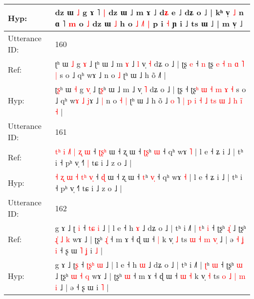 \documentclass[10pt]{article}
\DeclareRobustCommand{\hl}[1]{{\textcolor{red}{#1}}}
\begin{document}
\begin{longtable}{ll}
 \\
Hyp: & dz ɯ \hl{˩} g ɤ ˥\hl{ }\hl{|} dz ɯ ˩ m ɤ ˩ d\hl{ʑ} e ˩ dʑ o ˩ | kʰ v̩ \hl{˩} n ɑ ˥\hl{}\hl{} \hl{m} o \hl{˩} dz ɯ \hl{˩} h o\hl{ }\hl{˩}\hl{ }\hl{˩}\hl{˥} \hl{|} p i \hl{˧} ɲ i ˩ ts ɯ ˩ | m v̩ ˩
 \\
\midrule
Utterance ID: & 160 \\
Ref: & ʈ\hl{}ʰ ɯ \hl{˩} g \hl{}\hl{ɤ} ˩ ʈ\hl{}ʰ ɯ ˩ m\hl{ }\hl{ɤ} ˩\hl{ }\hl{l} v̩ \hl{˧} dʑ o ˩ | ʈʂ\hl{ }\hl{e} ˧\hl{ }\hl{n} ʈʂ\hl{ }\hl{e} \hl{˧} \hl{n} \hl{ɑ} \hl{˥} \hl{|} s o ˩ qʰ w\hl{}\hl{}\hl{}\hl{}\hl{}ɤ ˩\hl{}\hl{} n o\hl{}\hl{} \hl{˩} ʈʰ ɯ ˩ h õ ˩\hl{}\hl{}\hl{}˥\hl{}\hl{}\hl{}\hl{}\hl{}\hl{}\hl{}\hl{}\hl{}\hl{}\hl{}\hl{}\hl{}\hl{}\hl{}\hl{}\hl{}\hl{}\hl{}\hl{}\hl{}\hl{}\hl{}\hl{} |
 \\
Hyp: & ʈ\hl{ʂ}ʰ ɯ \hl{˧} g \hl{v}\hl{̩} ˩ ʈ\hl{ʂ}ʰ ɯ ˩ m\hl{}\hl{} ˩\hl{}\hl{} v̩ \hl{˥} dʑ o ˩ | ʈʂ\hl{}\hl{} ˧\hl{}\hl{} ʈʂ\hl{}\hl{ʰ} \hl{ɯ} \hl{˧} \hl{m} \hl{ɤ} \hl{˧} s o ˩ qʰ w\hl{ɤ}\hl{ }\hl{˩}\hl{ }\hl{j}ɤ ˩\hl{ }\hl{|} n o\hl{ }\hl{˧} \hl{|} ʈʰ ɯ ˩ h õ ˩\hl{ }\hl{o}\hl{ }˥\hl{ }\hl{|}\hl{ }\hl{p}\hl{ }\hl{i}\hl{ }\hl{˧}\hl{ }\hl{˩}\hl{ }\hl{t}\hl{s}\hl{ }\hl{ɯ}\hl{ }\hl{˩}\hl{ }\hl{h}\hl{ }\hl{i}\hl{̃}\hl{ }\hl{˧} |
 \\
\midrule
Utterance ID: & 161 \\
Ref: & \hl{t}\hl{ʰ} \hl{i} \hl{˩}\hl{˥} \hl{|} \hl{}\hl{ʐ} \hl{}\hl{ɯ} ˧ \hl{ʈ}\hl{ʂ}\hl{ʰ} ɯ ˧ ʐ ɯ ˧ \hl{ʈ}\hl{ʂ}ʰ \hl{}\hl{ɯ} ˧ qʰ wɤ \hl{˥} | l e ˧ ʑ i ˩ | tʰ i ˧ pʰ v̩ ˧˥\hl{ }\hl{|} tɕ i ˩ z o ˩ |
 \\
Hyp: & \hl{}\hl{˧} \hl{ʐ} \hl{}\hl{ɯ} \hl{˧} \hl{t}\hl{ʰ} \hl{v}\hl{̩} ˧ \hl{}\hl{}\hl{ɖ} ɯ ˧ ʐ ɯ ˧ \hl{}\hl{t}ʰ \hl{v}\hl{̩} ˧ qʰ wɤ \hl{˧} | l e ˧ ʑ i ˩ | tʰ i ˧ pʰ v̩ ˧˥\hl{}\hl{} tɕ i ˩ z o ˩ |
 \\
\midrule
Utterance ID: & 162 \\
Ref: & g ɤ ˩ ʈ\hl{ }\hl{i} ˧ \hl{}\hl{t}\hl{ɕ} \hl{i} ˩ | l e ˧ h \hl{ɤ} ˩ dʑ o ˩ | tʰ i ˩˥ | \hl{t}ʰ \hl{i} ˧ ʈʂʰ \hl{ɻ}\hl{̍} ˩ ʈʂʰ \hl{ɻ}\hl{̍} \hl{˩} \hl{k} wɤ ˩ | ʈʂʰ \hl{ɻ}\hl{̍} ˧ m ɤ ˧ ɖ ɯ ˧\hl{}\hl{} \hl{|} k v̩ \hl{˩} ts \hl{ɯ} \hl{˧} \hl{m} \hl{}\hl{v}\hl{̩} ˩ | ə\hl{ }\hl{˧}\hl{ }\hl{ʝ}\hl{ }\hl{i} ˧ ʂ ɯ\hl{ }\hl{˥}\hl{ }\hl{ʝ} i \hl{˩} |
 \\
Hyp: & g ɤ ˩ ʈ\hl{}\hl{ʂ} ˧ \hl{ʈ}\hl{ʂ}\hl{ʰ} \hl{ɯ} ˩ | l e ˧ h \hl{ɯ} ˩ dʑ o ˩ | tʰ i ˩˥ | \hl{ʈ}ʰ \hl{ɯ} ˧ ʈʂʰ \hl{}\hl{ɯ} ˩ ʈʂʰ \hl{}\hl{ɯ} \hl{˧} \hl{q} wɤ ˩ | ʈʂʰ \hl{}\hl{ɯ} ˧ m ɤ ˧ ɖ ɯ ˧\hl{ }\hl{ɯ} \hl{˧} k v̩ \hl{˧} ts \hl{o} \hl{˩} \hl{|} \hl{m}\hl{ }\hl{i} ˩ | ə\hl{}\hl{}\hl{}\hl{}\hl{}\hl{} ˧ ʂ ɯ\hl{}\hl{}\hl{}\hl{} i \hl{˥} |

\end{longtable}
\end{document}
